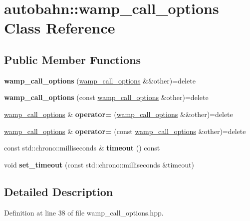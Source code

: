 \hypertarget{classautobahn_1_1wamp__call__options}{}\section{autobahn\+:\+:wamp\+\_\+call\+\_\+options Class Reference}
\label{classautobahn_1_1wamp__call__options}
\subsection*{Public Member Functions}
\begin{DoxyCompactItemize}
\item 
{\bfseries wamp\+\_\+call\+\_\+options} (\hyperlink{classautobahn_1_1wamp__call__options}{wamp\+\_\+call\+\_\+options} \&\&other)=delete\hypertarget{classautobahn_1_1wamp__call__options_a7320f5097f472fac99dcc0e6cdd6b244}{}\label{classautobahn_1_1wamp__call__options_a7320f5097f472fac99dcc0e6cdd6b244}

\item 
{\bfseries wamp\+\_\+call\+\_\+options} (const \hyperlink{classautobahn_1_1wamp__call__options}{wamp\+\_\+call\+\_\+options} \&other)=delete\hypertarget{classautobahn_1_1wamp__call__options_afffb86d4d60a63e73ffe1d4d24b5e14c}{}\label{classautobahn_1_1wamp__call__options_afffb86d4d60a63e73ffe1d4d24b5e14c}

\item 
\hyperlink{classautobahn_1_1wamp__call__options}{wamp\+\_\+call\+\_\+options} \& {\bfseries operator=} (\hyperlink{classautobahn_1_1wamp__call__options}{wamp\+\_\+call\+\_\+options} \&\&other)=delete\hypertarget{classautobahn_1_1wamp__call__options_a435b21f81e2056df9a59fa87a3b766eb}{}\label{classautobahn_1_1wamp__call__options_a435b21f81e2056df9a59fa87a3b766eb}

\item 
\hyperlink{classautobahn_1_1wamp__call__options}{wamp\+\_\+call\+\_\+options} \& {\bfseries operator=} (const \hyperlink{classautobahn_1_1wamp__call__options}{wamp\+\_\+call\+\_\+options} \&other)=delete\hypertarget{classautobahn_1_1wamp__call__options_aa7bde6f3533cefa13352c7687ade22cb}{}\label{classautobahn_1_1wamp__call__options_aa7bde6f3533cefa13352c7687ade22cb}

\item 
const std\+::chrono\+::milliseconds \& {\bfseries timeout} () const \hypertarget{classautobahn_1_1wamp__call__options_a8e68accff70a895c4aef95d04ea4d5a2}{}\label{classautobahn_1_1wamp__call__options_a8e68accff70a895c4aef95d04ea4d5a2}

\item 
void {\bfseries set\+\_\+timeout} (const std\+::chrono\+::milliseconds \&timeout)\hypertarget{classautobahn_1_1wamp__call__options_a30ac78e9ae0f3f2de813971fc3ad712c}{}\label{classautobahn_1_1wamp__call__options_a30ac78e9ae0f3f2de813971fc3ad712c}

\end{DoxyCompactItemize}


\subsection{Detailed Description}


Definition at line 38 of file wamp\+\_\+call\+\_\+options.\+hpp.

